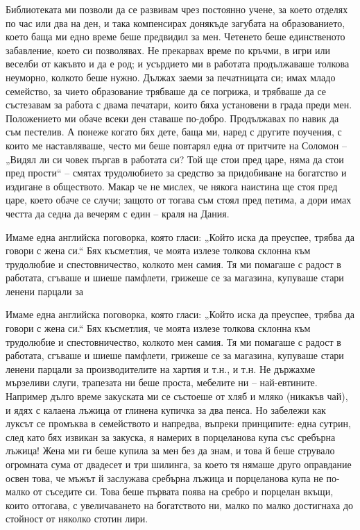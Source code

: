 \documentclass[12pt]{book}
\begin{document}
Библиотеката ми позволи да се развивам чрез постоянно учене, за което отделях по час или два на ден, и така компенсирах донякъде загубата на образованието, което баща ми едно време беше предвидил за мен. Четенето беше единственото забавление, което си позволявах. Не прекарвах време по кръчми, в игри или веселби от какъвто и да е род; и усърдието ми в работата продължаваше толкова неуморно, колкото беше нужно. Дължах заеми за печатницата си; имах младо семейство, за чието образование трябваше да се погрижа, и трябваше да се състезавам за работа с двама печатари, които бяха установени в града преди мен. Положението ми обаче всеки ден ставаше по-добро. Продължавах по навик да съм пестелив. А понеже когато бях дете, баща ми, наред с другите поучения, с които ме наставляваше, често ми беше повтарял една от притчите на Соломон – „Видял ли си човек пъргав в работата си? Той ще стои пред царе, няма да стои пред прости“ – смятах трудолюбието за средство за придобиване на богатство и издигане в обществото. Макар че не мислех, че някога наистина ще стоя пред царе, което обаче се случи; защото от тогава съм стоял пред петима, а дори имах честта да седна да вечерям с един – краля на Дания. 

Имаме една английска поговорка, която гласи: „Който иска да преуспее, трябва да говори с жена си.“ Бях късметлия, че моята излезе толкова склонна към трудолюбие и спестовничество, колкото мен самия. Тя ми помагаше с радост в работата, сгъваше и шиеше памфлети, грижеше се за магазина, купуваше стари ленени парцали за 

Имаме една английска поговорка, която гласи: „Който иска да преуспее, трябва да говори с жена си.“ Бях късметлия, че моята излезе толкова склонна към трудолюбие и спестовничество, колкото мен самия. Тя ми помагаше с радост в работата, сгъваше и шиеше памфлети, грижеше се за магазина, купуваше стари ленени парцали за производителите на хартия и т.н., и т.н. Не държахме мързеливи слуги, трапезата ни беше проста, мебелите ни – най-евтините. Например дълго време закуската ми се състоеше от хляб и мляко (никакъв чай), и ядях с калаена лъжица от  глинена купичка за два пенса. Но забележи как луксът се промъква в семейството и напредва, въпреки принципите: една сутрин, след като бях извикан за закуска, я намерих в порцеланова купа със сребърна лъжица! Жена ми ги беше купила за мен без да знам, и това й беше струвало огромната сума от двадесет и три шилинга, за което тя нямаше друго оправдание освен това, че мъжът й заслужава сребърна лъжица и порцеланова купа не по-малко от съседите си. Това беше първата поява на сребро и порцелан вкъщи, които оттогава, с увеличаването на богатството ни, малко по малко достигнаха до стойност от няколко стотин лири. 
\end{document}
